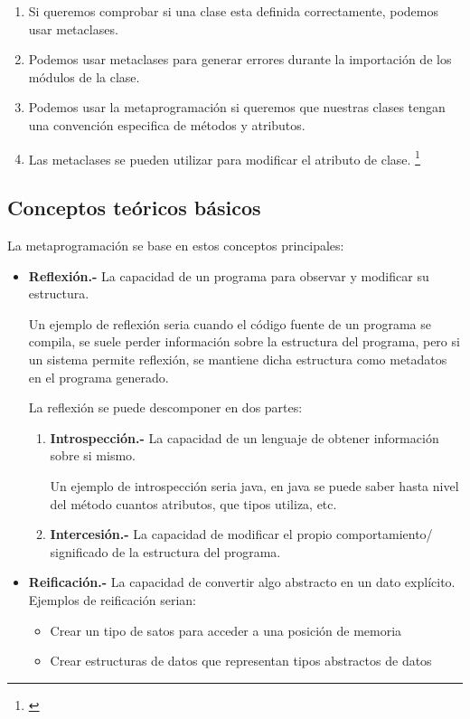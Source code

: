 \documentclass{cosas/tfg_domingo}
\begin{document}
\begin{enumerate}
    \item Si queremos comprobar si una clase esta definida correctamente, podemos usar metaclases.
    \item Podemos usar metaclases para generar errores durante la importación de los módulos de la clase.
    \item Podemos usar la metaprogramación si queremos que nuestras clases tengan una convención especifica de métodos y atributos.
    \item Las metaclases se pueden utilizar para modificar el atributo de clase.
    \footnote{\citep{Farhad}}
\end{enumerate}

\newpage
\subsection{Conceptos teóricos básicos}
La metaprogramación se base en estos conceptos principales:

\begin{itemize}
    \item \textbf{Reflexión.- } La capacidad de un programa para observar y modificar su estructura.
    
    Un ejemplo de reflexión seria cuando el código fuente de un programa se compila, se suele perder información sobre la estructura del programa, pero si un sistema permite reflexión, se mantiene dicha estructura como metadatos en el programa generado.
    
    La reflexión se puede descomponer en dos partes:
    
    \begin{enumerate}
        \item \textbf{Introspección.- } La capacidad de un lenguaje de obtener información sobre si mismo.
        
        Un ejemplo de introspección seria java, en java se puede saber hasta nivel del método cuantos atributos, que tipos utiliza, etc.
        \item \textbf{Intercesión.- } La capacidad de modificar el propio comportamiento/ significado de la estructura del programa.
    \end{enumerate}
    
    \item \textbf{Reificación.- } La capacidad de convertir algo abstracto en un dato explícito.
    Ejemplos de reificación serian:
    \begin{itemize}
        \item Crear un tipo de satos para acceder a una posición de memoria
        \item Crear estructuras de datos que representan tipos abstractos de datos
    \end{itemize}
\end{itemize}
\end{document}

